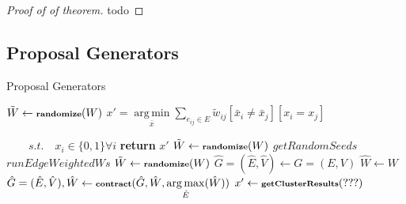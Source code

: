 \documentclass[10pt,twocolumn,letterpaper]{article}
\DeclareMathOperator*{\argmin}{arg\,min}
\DeclareMathOperator*{\argmax}{arg\,max}
\begin{document}
\begin{proof}[Proof of of theorem]
todo
\end{proof}








\subsection{Proposal Generators}






\begin{algorithm}
    \begin{scriptsize}
        \caption{Proposal Generators}\label{alg:proposal_gen}   
        \begin{algorithmic}[1]
            \State $\tilde{W} \gets \textbf{\scriptsize{randomize}}(W) $
            \State $x'= \argmin\limits_{\bar{x}} \sum\limits_{e_{ij} \in E } \tilde{w}_{ij}[\bar{x}_i \neq \bar{x}_j]  [x_i = x_j]   $

            $ \quad\quad s.t.\quad x_i \in \{0, 1\} \forall i $
            \State \textbf{return} $x'$
            \EndProcedure
            \vspace{0.3cm}
            \State $\tilde{W} \gets \textbf{\scriptsize{randomize}}(W) $
            \State $ getRandomSeeds$
            \State $ runEdgeWeightedWs$
            \EndProcedure   
            \vspace{0.3cm}
            \State $\tilde{W} \gets \textbf{\scriptsize{randomize}}(W) $
            \State $\hat{G}=(\hat{E},\hat{V}) \gets G=(E,V)$
            \State $\hat{W} \gets W$
                \State $\hat{G}=(\hat{E},\hat{V}),\hat{W} \gets 
                    \textbf{\scriptsize{contract}}(\hat{G},\hat{W},  \argmax\limits_{\hat{E}}(\hat{W}) )$
            \EndWhile
            \State $x' \gets \textbf{\scriptsize{getClusterResults}}(???) $ 
            \EndProcedure
        \end{algorithmic}
    \end{scriptsize}
\end{algorithm}
\end{document}
